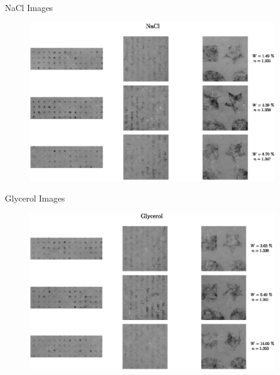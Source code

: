 \documentclass[10pt]{beamer}
\begin{document}
\begin{frame}{NaCl Images}
\begin{figure}
    \centering
    \includegraphics[width = 0.95\textwidth]{NaCl_Imgs002.eps}
    \label{NaClImg}
\end{figure}
\end{frame}

\begin{frame}{Glycerol Images}
\begin{figure}
    \centering
    \includegraphics[width = 0.95\textwidth]{Gly_Imgs002.eps}
    \label{Glyshapes}
\end{figure}
    
\end{frame}
\end{document}
